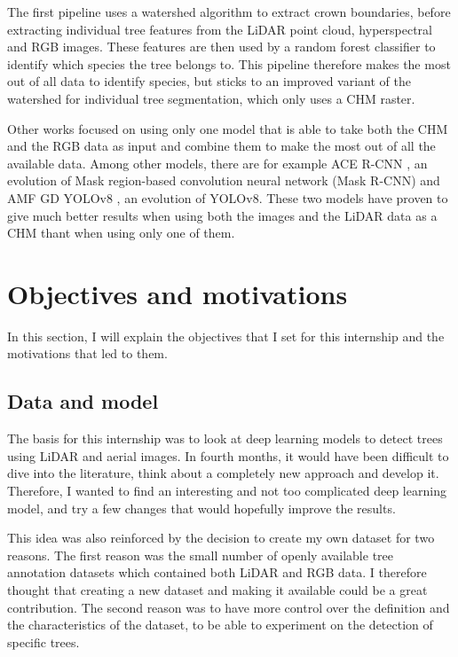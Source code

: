 \documentclass[
  letterpaper,
  DIV=11,
  numbers=noendperiod]{scrartcl}
\begin{document}
The first pipeline \autocite{lidar_rgb_wst} uses a watershed algorithm
to extract crown boundaries, before extracting individual tree features
from the LiDAR point cloud, hyperspectral and RGB images. These features
are then used by a random forest classifier to identify which species
the tree belongs to. This pipeline therefore makes the most out of all
data to identify species, but sticks to an improved variant of the
watershed for individual tree segmentation, which only uses a CHM
raster.

Other works focused on using only one model that is able to take both
the CHM and the RGB data as input and combine them to make the most out
of all the available data. Among other models, there are for example ACE
R-CNN \autocite{lidar_rgb_acnet}, an evolution of Mask region-based
convolution neural network (Mask R-CNN) and AMF GD YOLOv8
\autocite{amf_gd_yolov8}, an evolution of YOLOv8. These two models have
proven to give much better results when using both the images and the
LiDAR data as a CHM thant when using only one of them.

\section{Objectives and motivations}\label{objectives-and-motivations}

In this section, I will explain the objectives that I set for this
internship and the motivations that led to them.

\subsection{Data and model}\label{data-and-model}

The basis for this internship was to look at deep learning models to
detect trees using LiDAR and aerial images. In fourth months, it would
have been difficult to dive into the literature, think about a
completely new approach and develop it. Therefore, I wanted to find an
interesting and not too complicated deep learning model, and try a few
changes that would hopefully improve the results.

This idea was also reinforced by the decision to create my own dataset
for two reasons. The first reason was the small number of openly
available tree annotation datasets which contained both LiDAR and RGB
data. I therefore thought that creating a new dataset and making it
available could be a great contribution. The second reason was to have
more control over the definition and the characteristics of the dataset,
to be able to experiment on the detection of specific trees.
\end{document}
